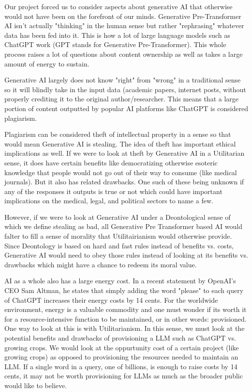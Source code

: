 \documentclass[letterpaper,11pt,leqno]{article}
\begin{document}
Our project forced us to consider aspects about generative AI that otherwise would not have been on the forefront of our minds. Generative Pre-Transformer AI isn't actually "thinking" in the human sense but rather "rephrasing" whatever data has been fed into it. This is how a lot of large language models such as ChatGPT work (GPT stands for Generative Pre-Transformer). This whole process raises a lot of questions about content ownership as well as takes a large amount of energy to sustain.

Generative AI largely does not know "right" from "wrong" in a traditional sense so it will blindly take in the input data (academic papers, internet posts, without properly crediting it to the original author/researcher. This means that a large portion of content outputted by popular AI platforms like ChatGPT is considered plagiarism.

Plagiarism can be considered theft of intellectual property in a sense so that would mean Generative AI is stealing. The idea of theft has important ethical implications as well. If we were to look at theft by Generative AI in a Utilitarian sense, it does have certain benefits like democratizing otherwise esoteric knowledge that people would not go out of their way to consume (like medical journals). But it also has related drawbacks. One such of these being unknown if any of the responses it outputs is true or not which could have important implications on the medical, legal, and political sectors to name a few.

However, if we were to look at Generative AI under a Deontological sense of which we define stealing as bad, all Generative Pre Transformer based AI would falter to fill a sense of morality that Utilitairianism would otherwise provide. Since Deontology is based on hard and fast rules instead of benefits vs. costs, Generative AI would need to obey those rules instead of looking at its benefits vs. drawbacks which might have a chance to redeem its moral value.

AI as a whole also has a large energy cost. In a recent statement by OpenAI's CEO Sam Altman, he states that simply adding the word "please" to each query of ChatGPT increases their energy costs by 14 cents. For the worldwide environment, energy is a valuable commodity and one must wonder if its worth it for a resource-intensive function to be maintained, or in other words: provisioned. One way to look at this is with Utilitarianism. In this sense, we must look at the potential benefits and drawbacks of provisioning a LLM such as ChatGPT vs. growing crops. We would look at the oppurtunity cost of a certain project (like growing crops) as opposed to provisioning the resources needed to maintain an LLM. If a single word in a query, one of billions, is enough to raise costs by 14 cents, it may not be worth provisioning for LLMs as much as the broader public would like to believe.
\end{document}
